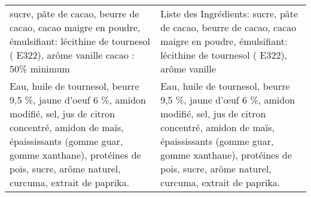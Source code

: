 \begin{longtable}{p{7cm}p{7cm}}
                                                                                                                                                         sucre, pâte de cacao, beurre de cacao, cacao maigre en poudre, émulsifiant: lécithine de tournesol ( E322), arôme vanille \newline cacao : 50\% minimum &                                                                                                                                                                                                                                                                                                                     Liste des Ingrédients: \newline sucre, pâte de cacao, beurre de cacao, cacao maigre en poudre, émulsifiant: lécithine de tournesol ( E322), arôme  \newline vanille \\
                                                               Eau, huile de tournesol, beurre 9,5 \%, jaune d'oeuf 6 \%, amidon modifié, sel, jus de citron concentré, amidon de maïs, épaississants (gomme guar, gomme xanthane), protéines de pois, sucre, arôme naturel, curcuma, extrait de paprika. &                                                                                                                                                                                                                               Eau, huile de tournesol, beurre 9,5 \%, jaune d'œuf 6 \%, amidon modifié, sel, jus de citron concentré, amidon de maïs, épaississants (gomme guar,  \newline gomme xanthane), protéines de pois, sucre, arôme naturel, curcuma, extrait de paprika. \\

\end{longtable}
